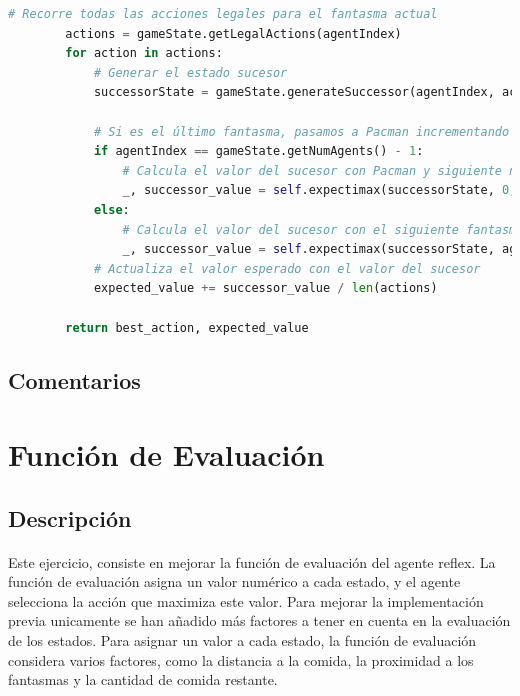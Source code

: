 \documentclass{report}
\begin{document}
\begin{lstlisting}[language=Python, caption=Implementación final del agente Expectimax]
        # Recorre todas las acciones legales para el fantasma actual
        actions = gameState.getLegalActions(agentIndex)
        for action in actions:
            # Generar el estado sucesor
            successorState = gameState.generateSuccessor(agentIndex, action)
            
            # Si es el último fantasma, pasamos a Pacman incrementando la profundidad
            if agentIndex == gameState.getNumAgents() - 1:
                # Calcula el valor del sucesor con Pacman y siguiente nivel de profundidad
                _, successor_value = self.expectimax(successorState, 0, depth + 1)
            else:
                # Calcula el valor del sucesor con el siguiente fantasma
                _, successor_value = self.expectimax(successorState, agentIndex + 1, depth)
            # Actualiza el valor esperado con el valor del sucesor
            expected_value += successor_value / len(actions)

        return best_action, expected_value            
            \end{lstlisting}
        \subsection*{Comentarios}
          \paragraph*{}{

          }
      \clearpage\section{Función de Evaluación}
        \subsection*{Descripción}
          \paragraph*{}{
            Este ejercicio, consiste en mejorar la función de evaluación del agente reflex. 
            La función de evaluación asigna un valor numérico a cada estado, y el agente selecciona la acción que maximiza este valor. 
            Para mejorar la implementación previa unicamente se han añadido más factores a tener en cuenta en la evaluación de los estados.
            Para asignar un valor a cada estado, la función de evaluación considera varios factores, como la distancia a la comida, la proximidad a los fantasmas y la cantidad de comida restante.
          }
\end{document}
